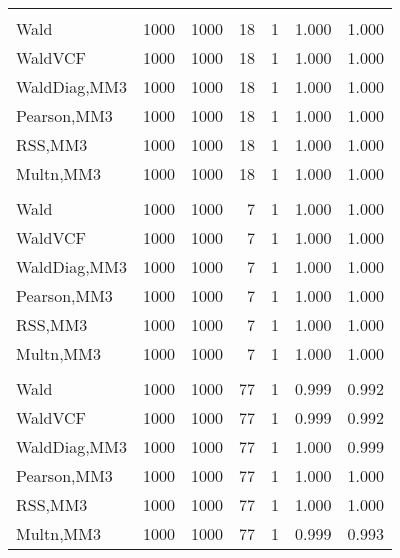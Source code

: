 \documentclass[
]{article}
\begin{document}
\begin{table}[H]
{\begin{tabular}[t]{lrrrrrr}
\addlinespace[0.3em]
\multicolumn{7}{l}{\textbf{1F 15V}}\\
\hspace{1em}Wald & 1000 & 1000 & 18 & 1 & 1.000 & 1.000\\
\hspace{1em}WaldVCF & 1000 & 1000 & 18 & 1 & 1.000 & 1.000\\
\hspace{1em}WaldDiag,MM3 & 1000 & 1000 & 18 & 1 & 1.000 & 1.000\\
\hspace{1em}Pearson,MM3 & 1000 & 1000 & 18 & 1 & 1.000 & 1.000\\
\hspace{1em}RSS,MM3 & 1000 & 1000 & 18 & 1 & 1.000 & 1.000\\
\hspace{1em}Multn,MM3 & 1000 & 1000 & 18 & 1 & 1.000 & 1.000\\
\addlinespace[0.3em]
\multicolumn{7}{l}{\textbf{2F 10V}}\\
\hspace{1em}Wald & 1000 & 1000 & 7 & 1 & 1.000 & 1.000\\
\hspace{1em}WaldVCF & 1000 & 1000 & 7 & 1 & 1.000 & 1.000\\
\hspace{1em}WaldDiag,MM3 & 1000 & 1000 & 7 & 1 & 1.000 & 1.000\\
\hspace{1em}Pearson,MM3 & 1000 & 1000 & 7 & 1 & 1.000 & 1.000\\
\hspace{1em}RSS,MM3 & 1000 & 1000 & 7 & 1 & 1.000 & 1.000\\
\hspace{1em}Multn,MM3 & 1000 & 1000 & 7 & 1 & 1.000 & 1.000\\
\addlinespace[0.3em]
\multicolumn{7}{l}{\textbf{3F 15V}}\\
\hspace{1em}Wald & 1000 & 1000 & 77 & 1 & 0.999 & 0.992\\
\hspace{1em}WaldVCF & 1000 & 1000 & 77 & 1 & 0.999 & 0.992\\
\hspace{1em}WaldDiag,MM3 & 1000 & 1000 & 77 & 1 & 1.000 & 0.999\\
\hspace{1em}Pearson,MM3 & 1000 & 1000 & 77 & 1 & 1.000 & 1.000\\
\hspace{1em}RSS,MM3 & 1000 & 1000 & 77 & 1 & 1.000 & 1.000\\
\hspace{1em}Multn,MM3 & 1000 & 1000 & 77 & 1 & 0.999 & 0.993\\
\bottomrule
\end{tabular}}
\endgroup{}
\end{table}
\end{document}
